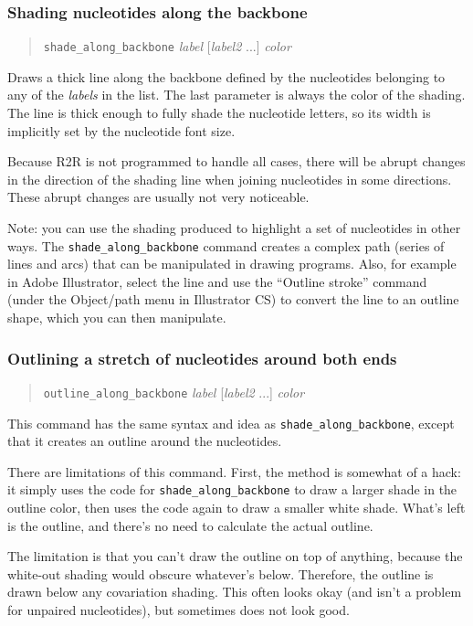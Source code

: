 \documentclass[letterpaper,12pt]{report}
\newcommand{\example}[1]{
\begin{quote}
{\raggedright
#1
}
\end{quote}
}
\begin{document}
\subsubsection{Shading nucleotides along the backbone}
\example{
{\tt shade\_along\_backbone}  \textit{label} [{\it label2} ...] {\it color}
}

Draws a thick line along the backbone defined by the nucleotides
belonging to any of the {\it labels} in the list.  The last parameter is always the color of the shading.
The line is thick enough to fully shade
the nucleotide letters, so its width is implicitly set by the nucleotide font size.

Because R2R is not programmed to handle all cases, there will be abrupt changes in the direction of the shading line when joining nucleotides in some directions.  These abrupt changes are usually not very noticeable.

Note: you can use the shading produced to highlight a set of nucleotides in
other ways.  The {\tt shade\_along\_backbone} command creates a complex path (series of lines 
and arcs) that can be manipulated in drawing programs.  Also, for example in Adobe Illustrator, select
the line and use the ``Outline stroke'' command (under the Object/path menu in Illustrator CS)
to convert the line to an outline shape, which you can then manipulate.


\subsubsection{Outlining a stretch of nucleotides around both ends}
\example{
{\tt outline\_along\_backbone}  \textit{label} [{\it label2} ...] {\it color}
}

This command has the same syntax and idea as {\tt shade\_along\_backbone}, except that it creates an outline around the nucleotides.

There are limitations of this command.  First, the method is somewhat of a hack: 
it simply uses the code for {\tt shade\_along\_backbone} to draw a larger shade in the outline color,
then uses the code again to draw a smaller white shade.  What's left is the outline, and there's no need to calculate the
actual outline.

The limitation is that you can't draw the outline on top of anything, because the white-out shading would obscure whatever's below.
Therefore, the outline is drawn below any covariation shading.  This often looks okay (and isn't a problem for unpaired nucleotides),
but sometimes does not look good.
\end{document}
